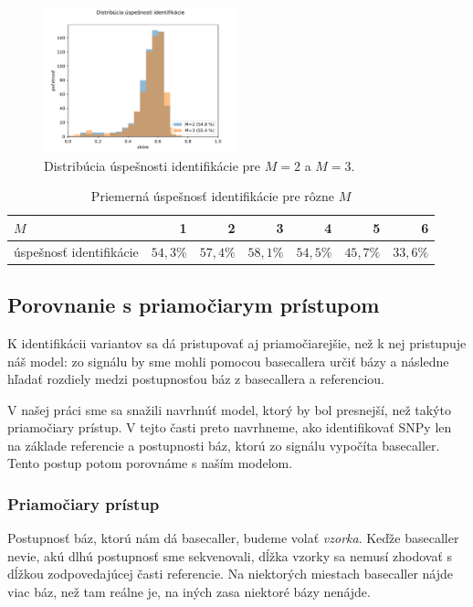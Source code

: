 \begin{figure}[t]
\centerline{\includegraphics[width=0.5\textwidth]{plots/4_uspesnost_1az2}}
\caption{Distribúcia úspešnosti identifikácie pre $M = 2$ a $M = 3$.}
\label{fig:uspesnost_M}
\end{figure}

\begin{table}[t]
\centering
\caption{Priemerná úspešnosť identifikácie pre rôzne $M$}
\label{my-label}
\begin{tabular}{lrrrrrr}
\hline
$M$                       & 1         & 2         & 3         & 4         & 5         & 6         \\ \hline
úspešnosť identifikácie & $54,3 \%$ & $57,4 \%$ & $58,1 \%$ & $54,5 \%$ & $45,7 \%$ & $33,6 \%$ \\ \hline
\end{tabular}
\label{tab:uspesnost_M}
\end{table}


\subsection{Porovnanie s priamočiarym prístupom}

K identifikácii variantov sa dá pristupovať aj priamočiarejšie, než k nej pristupuje náš model:
zo signálu by sme mohli pomocou basecallera určiť bázy a následne hľadať rozdiely medzi postupnosťou
báz z basecallera a referenciou.

V našej práci sme sa snažili navrhnúť model, ktorý by bol presnejší, než takýto priamočiary
prístup. V tejto časti preto navrhneme, ako identifikovať SNPy len na základe referencie a postupnosti
báz, ktorú zo signálu vypočíta basecaller. Tento postup potom porovnáme s naším modelom.

\subsubsection{Priamočiary prístup}

Postupnosť báz, ktorú nám dá basecaller, budeme volať \emph{vzorka}. Keďže basecaller nevie,
akú dlhú postupnosť sme sekvenovali, dĺžka vzorky sa nemusí zhodovať s dĺžkou 
zodpovedajúcej časti referencie.
Na niektorých miestach basecaller nájde viac báz, než tam reálne je, na iných zasa niektoré
bázy nenájde.

